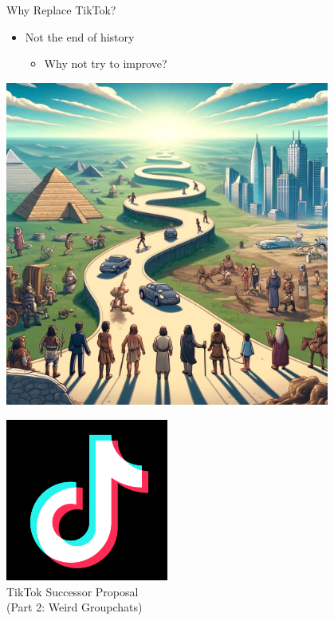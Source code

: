 \documentclass[aspectratio=35]{beamer} %
\begin{document}
\begin{frame}{Why Replace TikTok?}
\vspace{-0.7in}
\begin{itemize}
    \item Not the end of history
    \begin{itemize}
        \item Why not try to improve?
    \end{itemize}
\end{itemize}
\center
\includegraphics[width=0.8\textwidth]{imgs/why_replace/future_path.jpeg}
\end{frame}

\begin{frame}
\centering
\vspace{-1in}
\includegraphics[width=0.4\textwidth]{imgs/app_icons/tiktok-icon2.png}\\
TikTok Successor Proposal \\
(Part 2: Weird Groupchats)
\end{frame}
\end{document}
